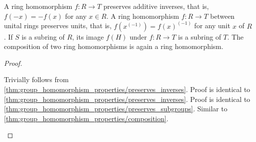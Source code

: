 \begin{proposition}\label{thm:ring_homomorphism_properties}
  \begin{defenum}
     A ring homomorphism \( f: R \to T \) preserves additive inverses, that is, \( f(-x) = -f(x) \) for any \( x \in R \).
     A ring homomorphism \( f: R \to T \) between unital rings preserves units, that is, \( f(x^{(-1)}) = f(x)^{(-1)} \) for any unit \( x \) of \( R \).
     If \( S \) is a subring of \( R \), its image \( f(H) \) under \( f: R \to T \) is a subring of \( T \).
     The composition of two ring homomorphisms is again a ring homomorphism.
  \end{defenum}
\end{proposition}
\begin{proof}
  \begin{description}
     Trivially follows from \cref{thm:group_homomorphism_properties/preserves_inverses}.
     Proof is identical to \cref{thm:group_homomorphism_properties/preserves_inverses}.
     Proof is identical to \cref{thm:group_homomorphism_properties/preserves_subgroups}.
     Similar to \cref{thm:group_homomorphism_properties/composition}.
  \end{description}
\end{proof}

